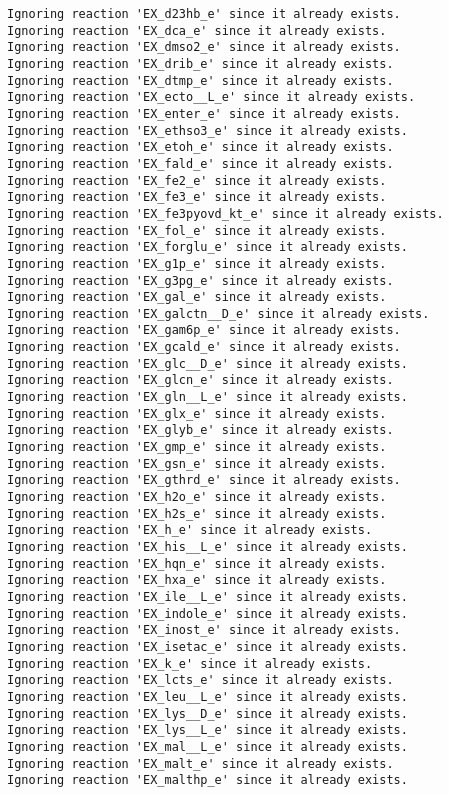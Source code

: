 \documentclass[
  letterpaper,
  DIV=11,
  numbers=noendperiod]{scrartcl}
\begin{document}
\begin{verbatim}
Ignoring reaction 'EX_d23hb_e' since it already exists.
Ignoring reaction 'EX_dca_e' since it already exists.
Ignoring reaction 'EX_dmso2_e' since it already exists.
Ignoring reaction 'EX_drib_e' since it already exists.
Ignoring reaction 'EX_dtmp_e' since it already exists.
Ignoring reaction 'EX_ecto__L_e' since it already exists.
Ignoring reaction 'EX_enter_e' since it already exists.
Ignoring reaction 'EX_ethso3_e' since it already exists.
Ignoring reaction 'EX_etoh_e' since it already exists.
Ignoring reaction 'EX_fald_e' since it already exists.
Ignoring reaction 'EX_fe2_e' since it already exists.
Ignoring reaction 'EX_fe3_e' since it already exists.
Ignoring reaction 'EX_fe3pyovd_kt_e' since it already exists.
Ignoring reaction 'EX_fol_e' since it already exists.
Ignoring reaction 'EX_forglu_e' since it already exists.
Ignoring reaction 'EX_g1p_e' since it already exists.
Ignoring reaction 'EX_g3pg_e' since it already exists.
Ignoring reaction 'EX_gal_e' since it already exists.
Ignoring reaction 'EX_galctn__D_e' since it already exists.
Ignoring reaction 'EX_gam6p_e' since it already exists.
Ignoring reaction 'EX_gcald_e' since it already exists.
Ignoring reaction 'EX_glc__D_e' since it already exists.
Ignoring reaction 'EX_glcn_e' since it already exists.
Ignoring reaction 'EX_gln__L_e' since it already exists.
Ignoring reaction 'EX_glx_e' since it already exists.
Ignoring reaction 'EX_glyb_e' since it already exists.
Ignoring reaction 'EX_gmp_e' since it already exists.
Ignoring reaction 'EX_gsn_e' since it already exists.
Ignoring reaction 'EX_gthrd_e' since it already exists.
Ignoring reaction 'EX_h2o_e' since it already exists.
Ignoring reaction 'EX_h2s_e' since it already exists.
Ignoring reaction 'EX_h_e' since it already exists.
Ignoring reaction 'EX_his__L_e' since it already exists.
Ignoring reaction 'EX_hqn_e' since it already exists.
Ignoring reaction 'EX_hxa_e' since it already exists.
Ignoring reaction 'EX_ile__L_e' since it already exists.
Ignoring reaction 'EX_indole_e' since it already exists.
Ignoring reaction 'EX_inost_e' since it already exists.
Ignoring reaction 'EX_isetac_e' since it already exists.
Ignoring reaction 'EX_k_e' since it already exists.
Ignoring reaction 'EX_lcts_e' since it already exists.
Ignoring reaction 'EX_leu__L_e' since it already exists.
Ignoring reaction 'EX_lys__D_e' since it already exists.
Ignoring reaction 'EX_lys__L_e' since it already exists.
Ignoring reaction 'EX_mal__L_e' since it already exists.
Ignoring reaction 'EX_malt_e' since it already exists.
Ignoring reaction 'EX_malthp_e' since it already exists.

\end{verbatim}
\end{document}
